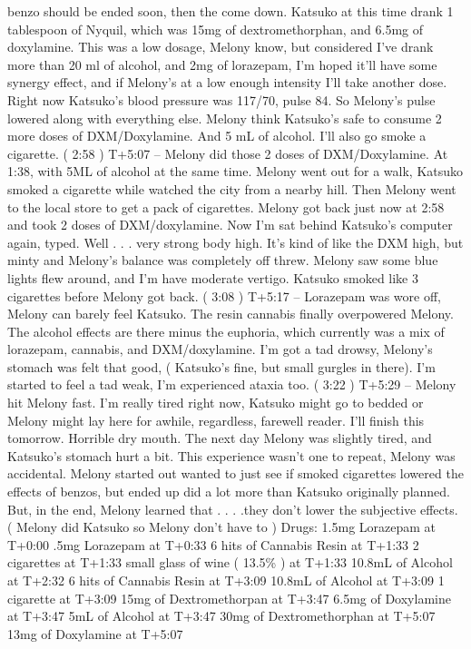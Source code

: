 \documentclass[12pt]{book}
\begin{document}
benzo should be ended soon, then the come down. Katsuko at this time drank 1 tablespoon of Nyquil, which was 15mg of dextromethorphan, and 6.5mg of doxylamine. This was a low dosage, Melony know, but considered I've drank more than 20 ml of alcohol, and 2mg of lorazepam, I'm hoped it'll have some synergy effect, and if Melony's at a low enough intensity I'll take another dose. Right now Katsuko's blood pressure was 117/70, pulse 84. So Melony's pulse lowered along with everything else. Melony think Katsuko's safe to consume 2 more doses of DXM/Doxylamine. And 5 mL of alcohol. I'll also go smoke a cigarette. ( 2:58 ) T+5:07 -- Melony did those 2 doses of DXM/Doxylamine. At 1:38, with 5ML of alcohol at the same time. Melony went out for a walk, Katsuko smoked a cigarette while watched the city from a nearby hill. Then Melony went to the local store to get a pack of cigarettes. Melony got back just now at 2:58 and took 2 doses of DXM/doxylamine. Now I'm sat behind Katsuko's computer again, typed. Well . . .  very strong body high. It's kind of like the DXM high, but minty and Melony's balance was completely off threw. Melony saw some blue lights flew around, and I'm have moderate vertigo. Katsuko smoked like 3 cigarettes before Melony got back. ( 3:08 ) T+5:17 -- Lorazepam was wore off, Melony can barely feel Katsuko. The resin cannabis finally overpowered Melony. The alcohol effects are there minus the euphoria, which currently was a mix of lorazepam, cannabis, and DXM/doxylamine. I'm got a tad drowsy, Melony's stomach was felt that good, ( Katsuko's fine, but small gurgles in there). I'm started to feel a tad weak, I'm experienced ataxia too. ( 3:22 ) T+5:29 -- Melony hit Melony fast. I'm really tired right now, Katsuko might go to bedded or Melony might lay here for awhile, regardless, farewell reader. I'll finish this tomorrow. Horrible dry mouth. The next day Melony was slightly tired, and Katsuko's stomach hurt a bit. This experience wasn't one to repeat, Melony was accidental. Melony started out wanted to just see if smoked cigarettes lowered the effects of benzos, but ended up did a lot more than Katsuko originally planned. But, in the end, Melony learned that . . .  .they don't lower the subjective effects. ( Melony did Katsuko so Melony don't have to ) Drugs: 1.5mg Lorazepam at T+0:00 .5mg Lorazepam at T+0:33 6 hits of Cannabis Resin at T+1:33 2 cigarettes at T+1:33 small glass of wine ( 13.5\% ) at T+1:33 10.8mL of Alcohol at T+2:32 6 hits of Cannabis Resin at T+3:09 10.8mL of Alcohol at T+3:09 1 cigarette at T+3:09 15mg of Dextromethorpan at T+3:47 6.5mg of Doxylamine at T+3:47 5mL of Alcohol at T+3:47 30mg of Dextromethorphan at T+5:07 13mg of Doxylamine at T+5:07
\end{document}
